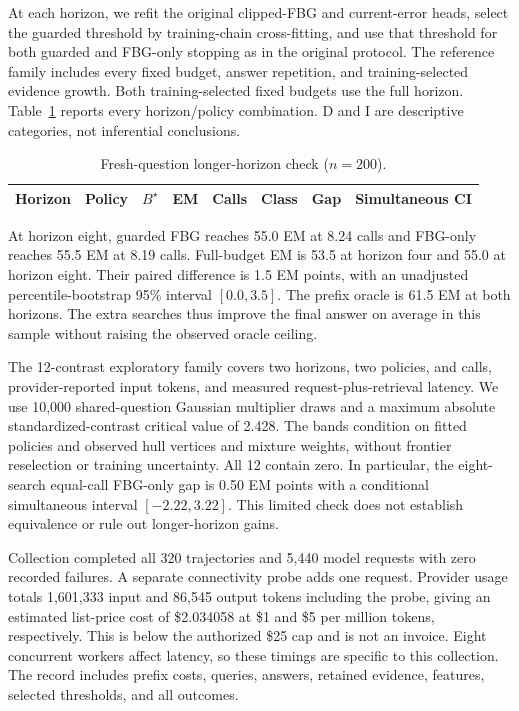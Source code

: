 \documentclass[manuscript,nonacm]{acmart}
\begin{document}
At each horizon, we refit the original clipped-FBG and current-error heads,
select the guarded threshold by training-chain cross-fitting, and use that
threshold for both guarded and FBG-only stopping as in the original protocol.
The reference family includes every fixed budget, answer repetition, and
training-selected evidence growth. Both training-selected fixed budgets use
the full horizon. Table~\ref{tab:long-horizon} reports every horizon/policy
combination. D and I are descriptive categories, not inferential conclusions.

\begin{table}[htbp]
\centering\small
\caption{Fresh-question longer-horizon check ($n=200$).}
\label{tab:long-horizon}
\begin{tabular}{rlrrrrrr}
\toprule
Horizon & Policy & $B^\star$ & EM & Calls & Class & Gap & Simultaneous CI\\
\midrule

\bottomrule
\end{tabular}
\end{table}

At horizon eight, guarded FBG reaches 55.0 EM at 8.24 calls and FBG-only
reaches 55.5 EM at 8.19 calls. Full-budget EM is 53.5 at horizon four and
55.0 at horizon eight. Their paired difference is 1.5 EM points, with an
unadjusted percentile-bootstrap 95\% interval $[0.0,3.5]$. The prefix oracle
is 61.5 EM at both horizons. The extra searches thus improve the final
answer on average in this sample without raising the observed oracle ceiling.

The 12-contrast exploratory family covers two horizons, two policies, and
calls, provider-reported input tokens, and measured request-plus-retrieval
latency. We use 10,000 shared-question Gaussian multiplier draws and a
maximum absolute standardized-contrast critical value of 2.428. The bands
condition on fitted policies and observed hull vertices and mixture weights,
without frontier reselection or training uncertainty. All 12 contain zero.
In particular, the eight-search equal-call FBG-only gap is 0.50 EM points
with a conditional simultaneous interval $[-2.22,3.22]$. This limited check
does not establish equivalence or rule out longer-horizon gains.

Collection completed all 320 trajectories and 5,440 model requests with
zero recorded failures. A separate connectivity probe adds one request.
Provider usage totals 1,601,333 input and 86,545 output tokens including the
probe, giving an estimated list-price cost of \$2.034058 at \$1 and \$5 per
million tokens, respectively. This is below the authorized \$25 cap and is
not an invoice. Eight concurrent workers affect latency, so these timings
are specific to this collection. The record includes prefix costs, queries,
answers, retained evidence, features, selected thresholds, and all outcomes.



\end{document}
